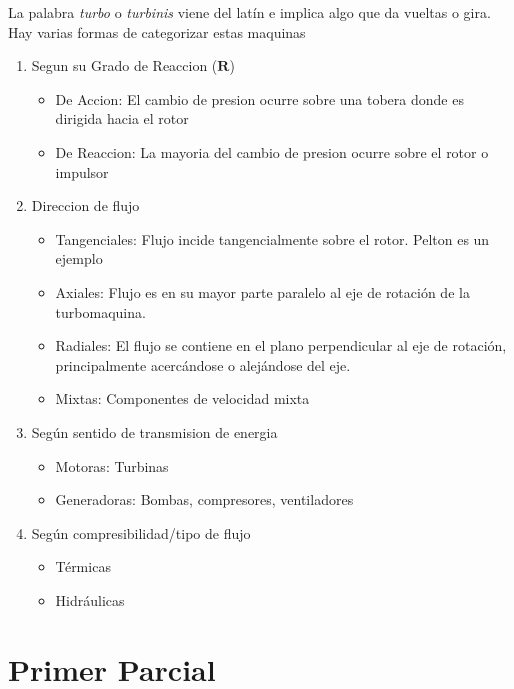 \documentclass{article}
\newcommand{\degreeofreaction}{{\bm{R}}}
\begin{document}
La palabra \textit{turbo} o \textit{turbinis} viene del latín e implica algo que da vueltas o gira. Hay varias formas de categorizar estas maquinas

\begin{enumerate}
    \item Segun su Grado de Reaccion ($\degreeofreaction$)
    \begin{itemize}
        \item De Accion: El cambio de presion ocurre sobre una tobera donde es dirigida hacia el rotor
        \item De Reaccion: La mayoria del cambio de presion ocurre sobre el rotor o impulsor
    \end{itemize}
    \item Direccion de flujo
    \begin{itemize}
        \item Tangenciales: Flujo incide tangencialmente sobre el rotor. Pelton es un ejemplo
        \item Axiales: Flujo es en su mayor parte paralelo al eje de rotación de la turbomaquina.
        \item Radiales: El flujo se contiene en el plano perpendicular al eje de rotación, principalmente acercándose o alejándose del eje.
        \item Mixtas: Componentes de velocidad mixta
    \end{itemize}
    \item Según sentido de transmision de energia
    \begin{itemize}
        \item Motoras: Turbinas
        \item Generadoras: Bombas, compresores, ventiladores
    \end{itemize}
    \item Según compresibilidad/tipo de flujo
    \begin{itemize}
        \item Térmicas
        \item Hidráulicas
    \end{itemize}
\end{enumerate}

\part{Primer Parcial}
\end{document}
